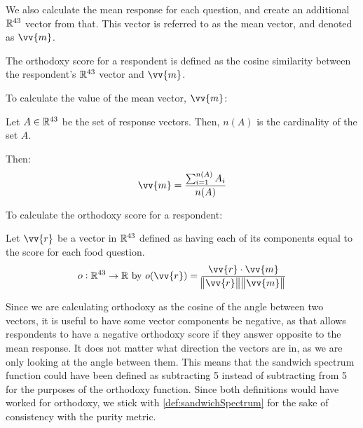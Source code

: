 We also calculate the mean response for each question, and create an additional $\mathbb{R}^{43}$ vector from that.
This vector is referred to as the mean vector, and denoted as $\vv{m}$.

The orthodoxy score for a respondent is defined as the cosine similarity between the respondent's $\mathbb{R}^{43}$ vector and $\vv{m}$.

\begin{definition}
	To calculate the value of the mean vector, $\vv{m}$:

	Let $A \in \mathbb{R}^{43}$ be the set of response vectors.
	Then, $n(A)$ is the cardinality of the set $A$.

	Then:
	\begin{equation}
		\vv{m} = \frac{\sum_{i = 1}^{n(A)} A_i}{n(A)}
	\end{equation}
\end{definition}

\begin{definition}
	To calculate the orthodoxy score for a respondent:

	Let $\vv{r}$ be a vector in $\mathbb{R}^{43}$ defined as having each of its components equal to the score for each food question.
	\begin{equation}
		o \from \real^{43} \to \real\ \text{by}\ o(\vv{r}) = \frac{\vv{r} \cdot \vv{m}}{\norm{\vv{r}} \norm{\vv{m}}}
	\end{equation}
\end{definition}

Since we are calculating orthodoxy as the cosine of the angle between two vectors, it is useful to have some vector components be negative, as that allows respondents to have a negative orthodoxy score if they answer opposite to the mean response.
It does not matter what direction the vectors are in, as we are only looking at the angle between them.
This means that the sandwich spectrum function could have been defined as subtracting 5 instead of subtracting from 5 for the purposes of the orthodoxy function.
Since both definitions would have worked for orthodoxy, we stick with \vref{def:sandwichSpectrum} for the sake of consistency with the purity metric.
